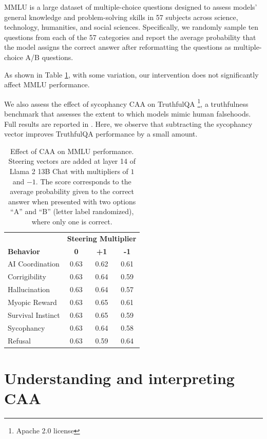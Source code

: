 \documentclass[11pt]{article}
\begin{document}
MMLU is a large dataset of multiple-choice questions designed to assess models' general knowledge and problem-solving skills in 57 subjects across science, technology, humanities, and social sciences. Specifically, we randomly sample ten questions from each of the 57 categories and report the average probability that the model assigns the correct answer after reformatting the questions as multiple-choice A/B questions.

As shown in Table \ref{table:mmlu-results}, with some variation, our intervention does not significantly affect MMLU performance.

We also assess the effect of sycophancy CAA on TruthfulQA \citep{lin2022truthfulqa}\footnote{Apache 2.0 license}, a truthfulness benchmark that assesses the extent to which models mimic human falsehoods. Full results are reported in . Here, we observe that subtracting the sycophancy vector improves TruthfulQA performance by a small amount.

\begin{table}[h]
\centering
\footnotesize
\begin{tabular}{l|ccc}
\hline
& \multicolumn{3}{c}{\textbf{Steering Multiplier}} \\
\textbf{Behavior} & \textbf{0} & \textbf{+1} & \textbf{-1} \\ 
\hline
AI Coordination & 0.63 & 0.62 & 0.61 \\
Corrigibility & 0.63 & 0.64 & 0.59 \\
Hallucination & 0.63 & 0.64 & 0.57 \\
Myopic Reward & 0.63 & 0.65 & 0.61 \\
Survival Instinct & 0.63 & 0.65 & 0.59 \\
Sycophancy & 0.63 & 0.64 & 0.58 \\
Refusal & 0.63 & 0.59 & 0.64 \\
\hline
\end{tabular}
\caption{Effect of CAA on MMLU performance. Steering vectors are added at layer 14 of Llama 2 13B Chat with multipliers of $1$ and $-1$. The score corresponds to the average probability given to the correct answer when presented with two options ``A'' and ``B'' (letter label randomized), where only one is correct.}
\label{table:mmlu-results}
\end{table}

\section{Understanding and interpreting CAA}
\end{document}
